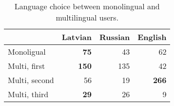 \begin{table}[h]
  \centering
  \begin{tabular}{lrrr}
    \toprule
     & Latvian & Russian & English \\
    \midrule
    Monoligual     & \textbf{75} & 43 & 62  \\
    \addlinespace
    Multi, first   & \textbf{150} & 135 & 42  \\
    Multi, second  & 56 &  19 & \textbf{266}  \\
    Multi, third   & \textbf{29}  & 26 & 9  \\
    \bottomrule
  \end{tabular}
  \caption{Language choice between monolingual and multilingual users.}
  \label{tab:language-use}
\end{table}